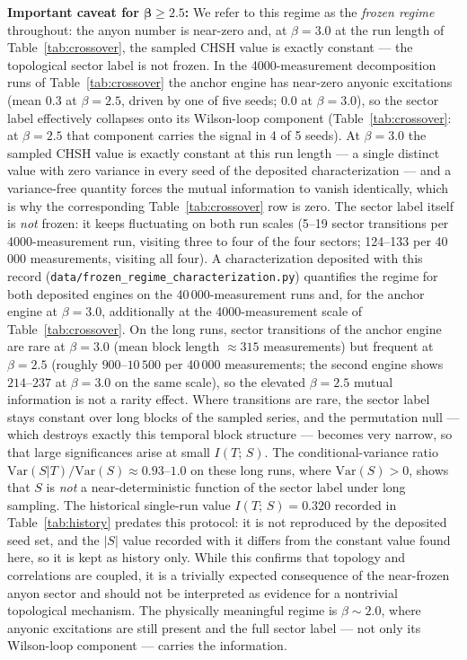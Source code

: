 \documentclass[aps,pra,twocolumn,superscriptaddress,showpacs,floatfix]{revtex4-2}
\newcommand{\MI}{I(T;\,S)}
\begin{document}
\textbf{Important caveat for $\bm{\beta \geq 2.5}$:} We refer to this regime as
the \emph{frozen regime} throughout: the anyon number is near-zero and, at
$\beta = 3.0$ at the run length of Table~\ref{tab:crossover}, the sampled CHSH
value is exactly constant --- the topological sector label is not frozen. In
the 4000-measurement decomposition runs of Table~\ref{tab:crossover} the anchor
engine has near-zero anyonic excitations (mean $0.3$ at $\beta = 2.5$, driven by
one of five seeds; $0.0$ at $\beta = 3.0$), so the sector label effectively
collapses onto its Wilson-loop component (Table~\ref{tab:crossover}: at
$\beta = 2.5$ that component carries the signal in 4 of 5 seeds). At
$\beta = 3.0$ the sampled CHSH value is exactly constant at this run length ---
a single distinct value with zero variance in every seed of the deposited
characterization --- and a variance-free quantity forces the mutual information
to vanish identically, which is why the corresponding Table~\ref{tab:crossover}
row is zero. The sector label itself is \emph{not} frozen: it keeps fluctuating
on both run scales (5--19 sector transitions per 4000-measurement run, visiting
three to four of the four sectors; 124--133 per 40\,000 measurements, visiting
all four).
A characterization deposited with this record
(\texttt{data/frozen\_regime\_characterization.py}) quantifies the regime for
both deposited engines on the 40\,000-measurement runs and, for the anchor
engine at $\beta = 3.0$, additionally at the 4000-measurement scale of
Table~\ref{tab:crossover}. On the long runs, sector transitions of the anchor
engine are rare at $\beta = 3.0$ (mean block length ${\approx}315$
measurements) but frequent at $\beta = 2.5$ (roughly $900$--$10\,500$ per
40\,000 measurements; the second engine shows $214$--$237$ at $\beta = 3.0$ on
the same scale), so the elevated $\beta = 2.5$ mutual information is not a
rarity effect. Where transitions are rare, the sector label stays constant over
long blocks of the sampled series, and the permutation null --- which destroys
exactly this temporal block structure --- becomes very narrow, so that large
significances arise at small $\MI$. The conditional-variance ratio
$\mathrm{Var}(S|T)/\mathrm{Var}(S) \approx 0.93$--$1.0$ on these long runs,
where $\mathrm{Var}(S) > 0$, shows that $S$ is \emph{not} a near-deterministic
function of the sector label under long sampling. The historical single-run
value $\MI = 0.320$ recorded in Table~\ref{tab:history} predates this protocol:
it is not reproduced by the deposited seed set, and the $|S|$ value recorded
with it differs from the constant value found here, so it is kept as history
only. While this
confirms that topology and correlations are coupled, it is a trivially expected
consequence of the near-frozen anyon sector and should not be interpreted as
evidence for a nontrivial topological mechanism. The physically meaningful
regime is $\beta \sim 2.0$, where anyonic excitations are still present and the
full sector label --- not only its Wilson-loop component --- carries the
information.
\end{document}
